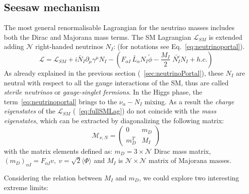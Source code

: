 \subsection{Seesaw mechanism}\label{sec:seesaw}
The most general renormalisable Lagrangian for the neutrino masses includes both the Dirac and Majorana mass terms. The SM Lagrangian $\mathcal{L}_{SM}$ is extended adding $\mathcal{N}$ right-handed neutrinos $N_I$: (for notations see Eq.~\ref{eq:neutrinoportal}).
\begin{equation}
\label{eq:fullSMLag}
 \mathcal{L} = \mathcal{L}_{SM}+ i \bar N_I \partial_\mu \gamma^\mu N_I -
  \left(F_{\alpha I} \,\bar L_\alpha N_I \tilde \phi 
    - \frac{M_I}{2} \; \bar {N_I^c} N_I + h.c.\right)
\end{equation}
As already explained in the previous section (~\ref{sec:neutrinoPortal}), these $N_I$ are neutral with respect to all the gauge interactions of the SM, thus are called \emph{sterile neutrinos} or \emph{gauge-singlet fermions}.
In the Higgs phase, the term~\ref{eq:neutrinoportal} brings to the $\nu_{\alpha} - N_I$ mixing. As a result the \emph{charge eigenstates} of the $\mathcal{L}_{SM}$ (~\ref{eq:fullSMLag}) do not coincide with the \emph{mass eigenstates}, which can be extracted by diagonalizing the following matrix:
\begin{equation}
\label{eq:matrixmass}
 \mathcal{M}_{\nu,N} = 
\begin{pmatrix}
0 & m_D\\
m^{T}_{D} & M_I
\end{pmatrix}
\end{equation}
with the matrix elements defined as: $m_D = 3 \times  \mathcal{N}$ Dirac mass matrix, $(m_D)_{\alpha I} = F_{\alpha I}v, \; v = \sqrt{2}\langle \Phi \rangle$ and $M_I$ is $\mathcal{N} \times \mathcal{N}$ matrix of Majorana masses.

Considering the relation between $M_I$ and $m_D$, we could explore two interesting extreme limits:
